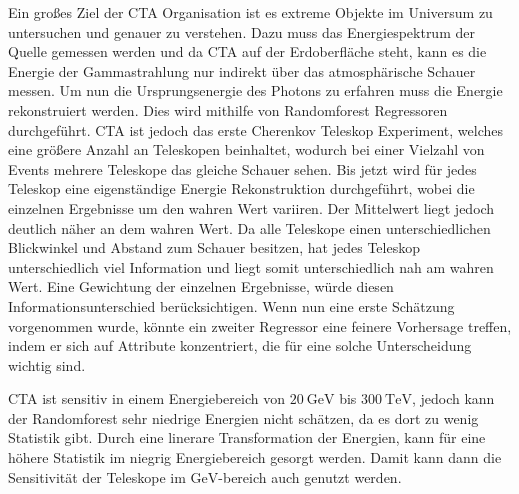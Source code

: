 Ein großes Ziel der CTA Organisation ist es extreme Objekte im Universum zu untersuchen und genauer zu verstehen. Dazu muss das
Energiespektrum der Quelle gemessen werden und da CTA auf der Erdoberfläche steht, kann es die Energie der Gammastrahlung nur indirekt über
das atmosphärische Schauer messen. Um nun die Ursprungsenergie des Photons zu erfahren muss die Energie rekonstruiert werden. Dies wird
mithilfe von Randomforest Regressoren durchgeführt. CTA ist jedoch das erste Cherenkov Teleskop Experiment, welches eine größere
Anzahl an Teleskopen beinhaltet, wodurch bei einer Vielzahl von Events mehrere Teleskope das gleiche Schauer sehen. Bis jetzt wird für
jedes Teleskop eine eigenständige Energie Rekonstruktion durchgeführt, wobei die einzelnen Ergebnisse um den wahren Wert variiren. Der
Mittelwert liegt jedoch deutlich näher an dem wahren Wert. Da alle Teleskope einen unterschiedlichen Blickwinkel und Abstand zum Schauer
besitzen, hat jedes Teleskop unterschiedlich viel Information und liegt somit unterschiedlich nah am wahren Wert. Eine Gewichtung der
einzelnen Ergebnisse, würde diesen Informationsunterschied berücksichtigen. Wenn nun eine erste Schätzung vorgenommen wurde, könnte ein
zweiter Regressor eine feinere Vorhersage treffen, indem er sich auf Attribute konzentriert, die für eine solche Unterscheidung wichtig sind.

CTA ist sensitiv in einem Energiebereich von $\SI{20}{\giga\eV}$ bis $\SI{300}{\tera\eV}$\cite{CTAscience}, jedoch kann der Randomforest
sehr niedrige Energien nicht schätzen, da es dort zu wenig Statistik gibt. Durch eine linerare Transformation der Energien, kann für eine
höhere Statistik im niegrig Energiebereich gesorgt werden. Damit kann dann die Sensitivität der Teleskope im $\si{\giga\eV}$-bereich
auch genutzt werden.
